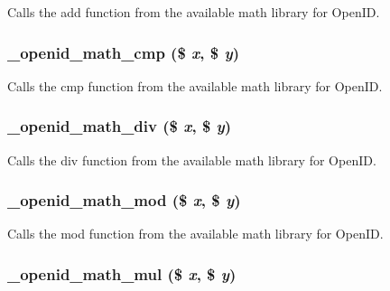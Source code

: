 \label{openid_8inc_aeaea462656fcdd8460240178b6cd76a1}
Calls the add function from the available math library for OpenID. \hypertarget{openid_8inc_ae52dd06bfa5de08a302bad1b9795b3f6}{
\subsubsection[{\_\-openid\_\-math\_\-cmp}]{\setlength{\rightskip}{0pt plus 5cm}\_\-openid\_\-math\_\-cmp (\$ {\em x}, \/  \$ {\em y})}}
\label{openid_8inc_ae52dd06bfa5de08a302bad1b9795b3f6}
Calls the cmp function from the available math library for OpenID. \hypertarget{openid_8inc_a744c3bb5bec3bb9be16c1445b32f9399}{
\subsubsection[{\_\-openid\_\-math\_\-div}]{\setlength{\rightskip}{0pt plus 5cm}\_\-openid\_\-math\_\-div (\$ {\em x}, \/  \$ {\em y})}}
\label{openid_8inc_a744c3bb5bec3bb9be16c1445b32f9399}
Calls the div function from the available math library for OpenID. \hypertarget{openid_8inc_ac33215e0ff27a3d2e454891ead7662a9}{
\subsubsection[{\_\-openid\_\-math\_\-mod}]{\setlength{\rightskip}{0pt plus 5cm}\_\-openid\_\-math\_\-mod (\$ {\em x}, \/  \$ {\em y})}}
\label{openid_8inc_ac33215e0ff27a3d2e454891ead7662a9}
Calls the mod function from the available math library for OpenID. \hypertarget{openid_8inc_a4081e0bfb8cf14326b426c89e4293952}{
\subsubsection[{\_\-openid\_\-math\_\-mul}]{\setlength{\rightskip}{0pt plus 5cm}\_\-openid\_\-math\_\-mul (\$ {\em x}, \/  \$ {\em y})}}
